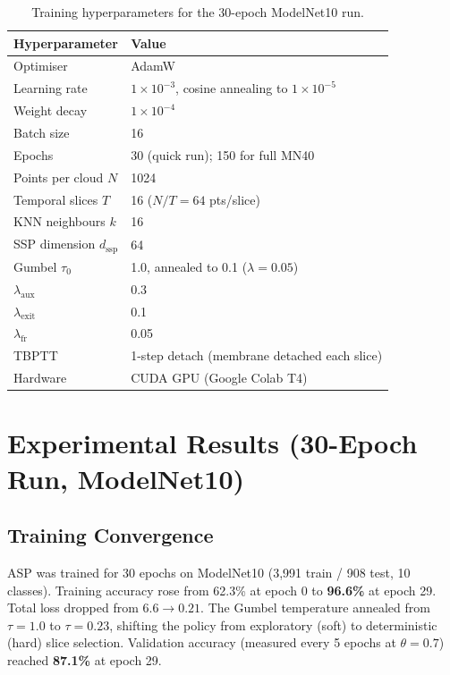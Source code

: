 \documentclass[11pt,a4paper]{article}
\begin{document}
\begin{table}[H]
  \centering
  \caption{Training hyperparameters for the 30-epoch ModelNet10 run.}
  \label{tab:hyper}
  \begin{tabular}{ll}
    \toprule
    \textbf{Hyperparameter} & \textbf{Value} \\
    \midrule
    Optimiser             & AdamW \\
    Learning rate         & $1{\times}10^{-3}$, cosine annealing to $1{\times}10^{-5}$ \\
    Weight decay          & $1{\times}10^{-4}$ \\
    Batch size            & 16 \\
    Epochs                & 30 (quick run); 150 for full MN40 \\
    Points per cloud $N$  & 1024 \\
    Temporal slices $T$   & 16 \quad($N/T = 64$ pts/slice) \\
    KNN neighbours $k$    & 16 \\
    SSP dimension $d_\text{ssp}$ & 64 \\
    Gumbel $\tau_0$       & 1.0, annealed to 0.1 ($\lambda{=}0.05$) \\
    $\lambda_\text{aux}$  & 0.3 \\
    $\lambda_\text{exit}$ & 0.1 \\
    $\lambda_\text{fr}$   & 0.05 \\
    TBPTT                 & 1-step detach (membrane detached each slice) \\
    Hardware              & CUDA GPU (Google Colab T4) \\
    \bottomrule
  \end{tabular}
\end{table}

\section{Experimental Results (30-Epoch Run, ModelNet10)}

\subsection{Training Convergence}

ASP was trained for 30 epochs on ModelNet10 (3,991 train / 908 test,
10 classes). Training accuracy rose from 62.3\% at epoch 0 to \textbf{96.6\%}
at epoch 29. Total loss dropped from $6.6 \to 0.21$. The Gumbel temperature
annealed from $\tau{=}1.0$ to $\tau{=}0.23$, shifting the policy from
exploratory (soft) to deterministic (hard) slice selection. Validation
accuracy (measured every 5 epochs at $\theta{=}0.7$) reached \textbf{87.1\%}
at epoch 29.
\end{document}
